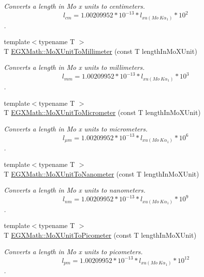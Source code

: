 \begin{DoxyCompactItemize}
\begin{DoxyCompactList}\small\item\em Converts a length in Mo x units to centimeters. \[ l_{cm}=1.00209952*10^{-13} * l_{xu(Mo\ K\alpha_1)} * 10^{2} \]. \end{DoxyCompactList}\item 
{\footnotesize template$<$typename T $>$ }\\T \mbox{\hyperlink{group___e_g_x_math-_conversions-_length_conversions-_non-_s_i-_mo_x_unit-_s_i_gacc95302aafadf7f38b9952f6a73c1279}{E\+G\+X\+Math\+::\+Mo\+X\+Unit\+To\+Millimeter}} (const T length\+In\+Mo\+X\+Unit)
\begin{DoxyCompactList}\small\item\em Converts a length in Mo x units to millimeters. \[ l_{mm}=1.00209952*10^{-13} * l_{xu(Mo\ K\alpha_1)} * 10^{3} \]. \end{DoxyCompactList}\item 
{\footnotesize template$<$typename T $>$ }\\T \mbox{\hyperlink{group___e_g_x_math-_conversions-_length_conversions-_non-_s_i-_mo_x_unit-_s_i_ga1608daf69fda5b90eabc5f8d47831f18}{E\+G\+X\+Math\+::\+Mo\+X\+Unit\+To\+Micrometer}} (const T length\+In\+Mo\+X\+Unit)
\begin{DoxyCompactList}\small\item\em Converts a length in Mo x units to micrometers. \[ l_{\mu m}=1.00209952*10^{-13} * l_{xu(Mo\ K\alpha_1)} * 10^{6} \]. \end{DoxyCompactList}\item 
{\footnotesize template$<$typename T $>$ }\\T \mbox{\hyperlink{group___e_g_x_math-_conversions-_length_conversions-_non-_s_i-_mo_x_unit-_s_i_ga69668ee6be867c3f92e31f29ec2ae7fa}{E\+G\+X\+Math\+::\+Mo\+X\+Unit\+To\+Nanometer}} (const T length\+In\+Mo\+X\+Unit)
\begin{DoxyCompactList}\small\item\em Converts a length in Mo x units to nanometers. \[ l_{nm}=1.00209952*10^{-13} * l_{xu(Mo\ K\alpha_1)} * 10^{9} \]. \end{DoxyCompactList}\item 
{\footnotesize template$<$typename T $>$ }\\T \mbox{\hyperlink{group___e_g_x_math-_conversions-_length_conversions-_non-_s_i-_mo_x_unit-_s_i_ga9b06995f2d8ddd611999e65539f0896c}{E\+G\+X\+Math\+::\+Mo\+X\+Unit\+To\+Picometer}} (const T length\+In\+Mo\+X\+Unit)
\begin{DoxyCompactList}\small\item\em Converts a length in Mo x units to picometers. \[ l_{pm}=1.00209952*10^{-13} * l_{xu(Mo\ K\alpha_1)} * 10^{12} \]. \end{DoxyCompactList}\item 

\end{DoxyCompactItemize}
